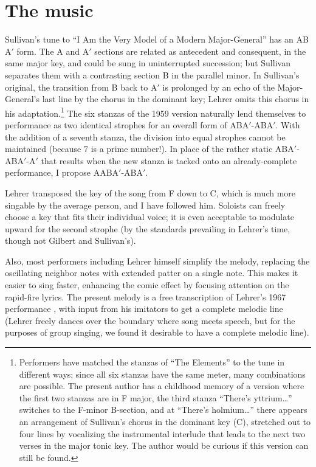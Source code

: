 \documentclass{article}
\begin{document}
\section{The music}
Sullivan's tune to ``I Am the Very Model of a Modern Major-General'' has an AB$\text{A}'$ form. The A and $\text{A}'$ sections are related as antecedent and consequent, in the same major key, and could be sung in uninterrupted succession; but Sullivan separates them with a contrasting section B in the parallel minor. In Sullivan's original, the transition from B back to $\text{A}'$ is prolonged by an echo of the Major-General's last line by the chorus in the dominant key; Lehrer omits this chorus in his adaptation.\footnote{Performers have matched the stanzas of ``The Elements'' to the tune in different ways; since all six stanzas have the same meter, many combinations are possible. The present author has a childhood memory of a version where the first two stanzas are in F major, the third stanza ``There's yttrium\dots'' switches to the F-minor B-section, and at ``There's holmium\dots'' there appears an arrangement of Sullivan's chorus in the dominant key (C), stretched out to four lines by vocalizing the instrumental interlude that leads to the next two verses in the major tonic key. The author would be curious if this version can still be found.} The six stanzas of the 1959 version naturally lend themselves to performance as two identical strophes for an overall form of AB$\text{A}'$-AB$\text{A}'$. With the addition of a seventh stanza, the division into equal strophes cannot be maintained (because $7$ is a prime number!). In place of the rather static AB$\text{A}'$-AB$\text{A}'$-$\text{A}'$ that results when the new stanza is tacked onto an already-complete performance, I propose AAB$\text{A}'$-AB$\text{A}'$.

Lehrer transposed the key of the song from F down to C, which is much more singable by the average person, and I have followed him. Soloists can freely choose a key that fits their individual voice; it is even acceptable to modulate upward for the second strophe (by the standards prevailing in Lehrer's time, though not Gilbert and Sullivan's).

Also, most performers including Lehrer himself simplify the melody, replacing the oscillating neighbor notes with extended patter on a single note. This makes it easier to sing faster, enhancing the comic effect by focusing attention on the rapid-fire lyrics. The present melody is a free transcription of Lehrer's 1967 performance \citep{Lehrer_perform}, with input from his imitators to get a complete melodic line (Lehrer freely dances over the boundary where song meets speech, but for the purposes of group singing, we found it desirable to have a complete melodic line).
\end{document}

